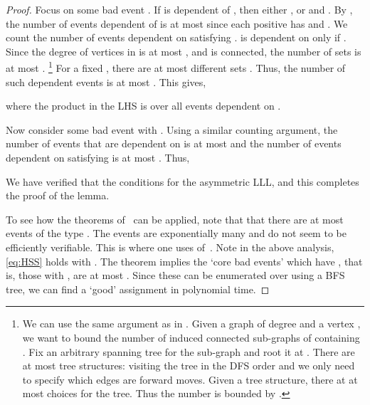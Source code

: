 \documentclass[11pt]{article}
\begin{document}
\begin{proof}
Focus on some bad event . If  is dependent of , then either , or  and . By , the number of events  dependent of  is at most  since each positive  has  and .  We count the number of events  dependent on  satisfying .   is dependent on  only if . Since the degree of vertices in  is at most , and  is connected, the number of sets  is at most . \footnote{We can use the same argument as in \cite{Fei08}. Given a graph  of degree  and a vertex , we want to bound the number of induced connected sub-graphs of  containing . Fix an arbitrary spanning tree for the sub-graph and root it at . There are at most  tree structures: visiting the tree in the DFS order and we only need to specify which  edges are forward moves. Given a tree structure, there at at most  choices for the tree. Thus the number is bounded by .} 
For a fixed , there are at most  different sets .  Thus, the number of such dependent events is at most .  This gives, 
\ifdefined\CR

\else

\fi
where the product in the LHS is over all events  dependent on .  

Now consider some bad event  with . Using a similar counting argument, the number of events  that are dependent on  is at most  and the number of events  dependent on  satisfying  is at most .  Thus, 
\ifdefined\CR

\else

\fi
We have verified that the conditions for the asymmetric LLL, and this completes the proof of the lemma.

To see how the theorems of~\cite{MT10,HSS11} can be applied, note that that there are at most  events of the type . The events  are exponentially many and do not seem to be efficiently verifiable. 
This is where one uses  of~\cite{HSS11}. Note in the above analysis, \eqref{eq:HSS} holds with . The theorem implies the `core bad events' which have , that is, those with  , are at most . Since these can be enumerated over using a BFS tree, 
we can find a `good' assignment in polynomial time.
\end{proof}
\end{document}
